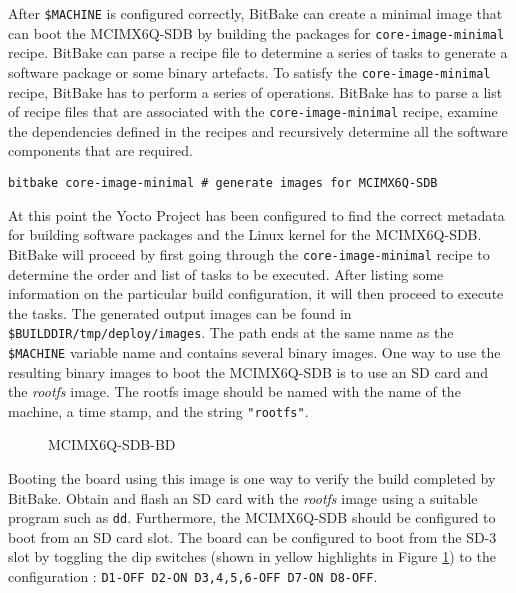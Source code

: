 After \texttt{\$MACHINE} is configured correctly, BitBake can create a minimal image that can boot the MCIMX6Q-SDB by building the packages for \texttt{core-image-minimal} recipe. BitBake can parse a recipe file to determine a series of tasks to generate a software package or some binary artefacts. To satisfy the \texttt{core-image-minimal} recipe, BitBake has to perform a series of operations. BitBake has to parse a list of recipe files that are associated with the \texttt{core-image-minimal} recipe, examine the dependencies defined in the recipes and recursively determine all the software components that are required.

\begin{verbatim}
bitbake core-image-minimal # generate images for MCIMX6Q-SDB
\end{verbatim}

At this point the Yocto Project has been configured to find the correct metadata for building software packages and the Linux kernel for the MCIMX6Q-SDB. BitBake will proceed by first going through the \texttt{core-image-minimal} recipe to determine the order and list of tasks to be executed. After listing some information on the particular build configuration, it will then proceed to execute the tasks. The generated output images can be found in \texttt{\$BUILDDIR/tmp/deploy/images}. The path ends at the same name as the \texttt{\$MACHINE} variable name and contains several binary images. One way to use the resulting binary images to boot the MCIMX6Q-SDB is to use an SD card and the \textit{rootfs} image. The rootfs image should be named with the name of the machine, a time stamp, and the string \texttt{"rootfs"}.


\begin{figure}[h]
	\centering
	\caption{MCIMX6Q-SDB-BD}
	\label{fig:mcimx6q-sdb}
\end{figure}

Booting the board using this image is one way to verify the build completed by BitBake. Obtain and flash an SD card with the \textit{rootfs} image using a suitable program such as \texttt{dd}. Furthermore, the MCIMX6Q-SDB should be configured to boot from an SD card slot. The board can be configured to boot from the SD-3 slot by toggling the dip switches (shown in yellow highlights in Figure \ref{fig:mcimx6q-sdb}) to the configuration : \texttt{D1-OFF D2-ON D3,4,5,6-OFF D7-ON D8-OFF}.


